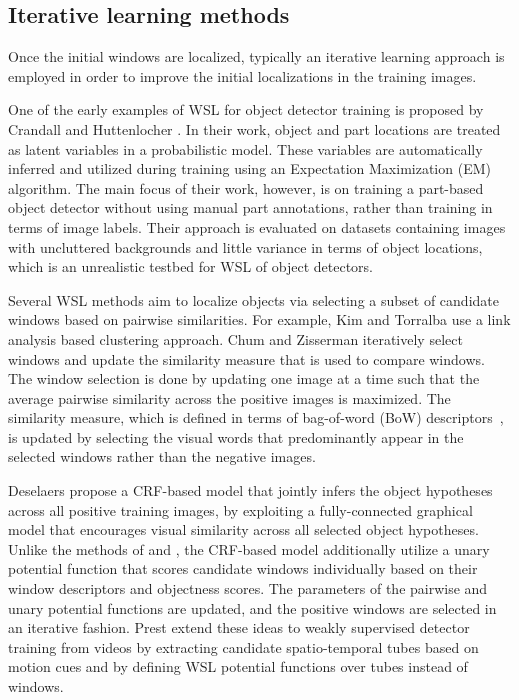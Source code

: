 \documentclass[10pt,journal,cspaper,final,twocolumn,compsoc]{./IEEEtran}
\begin{document}
\subsection{Iterative learning methods}\label{sec:related_reloc}

Once the initial windows are localized, typically an
iterative learning approach is employed in order to
improve the initial localizations in the training images.

One of the early examples of WSL for object detector
training is proposed by Crandall and Huttenlocher \cite{crandall06eccv}.
In their work, object and part locations are treated as
latent variables in a probabilistic model.  These
variables are automatically inferred and utilized during
training using an  Expectation Maximization (EM)
algorithm. The main focus of their work, however, is
 on training a part-based object detector without
using manual part annotations, rather than training in
terms of image labels. Their approach is
evaluated on datasets containing images with
uncluttered backgrounds and little variance in terms of
object locations, which is an unrealistic testbed for
WSL of object detectors.

Several WSL methods aim to localize objects via selecting
a subset of candidate windows based on pairwise
similarities.  For example, Kim and Torralba
\cite{kim09nips} use a  link analysis based
clustering approach.  Chum and Zisserman \cite{chum07cvpr}
iteratively select windows and update the similarity
measure that is used to compare windows.  The window
selection is done by updating one image at a time such
that the average pairwise similarity across the positive
images is maximized. The similarity measure, which is
defined in terms of bag-of-word (BoW) descriptors~\cite{dance04eccv}, is updated by
selecting the visual words that predominantly appear in
the selected windows rather than the negative images.  

Deselaers \etal\cite{deselaers12ijcv} propose a CRF-based
model that jointly infers the object hypotheses across all
positive training images, by exploiting a fully-connected
graphical model that encourages visual similarity across
all selected object hypotheses.  Unlike the methods of
\cite{kim09nips} and \cite{chum07cvpr}, the CRF-based
model additionally utilize a  unary potential
function that scores candidate windows individually based on their 
window descriptors and objectness scores. The
parameters of the pairwise and unary potential functions
are updated, and the positive windows are selected in an
iterative fashion. Prest \etal\cite{prest12cvpr} extend
these ideas to weakly supervised detector training from
videos by extracting candidate spatio-temporal tubes based
on motion cues and by defining WSL potential functions
over tubes instead of windows.
\end{document}
